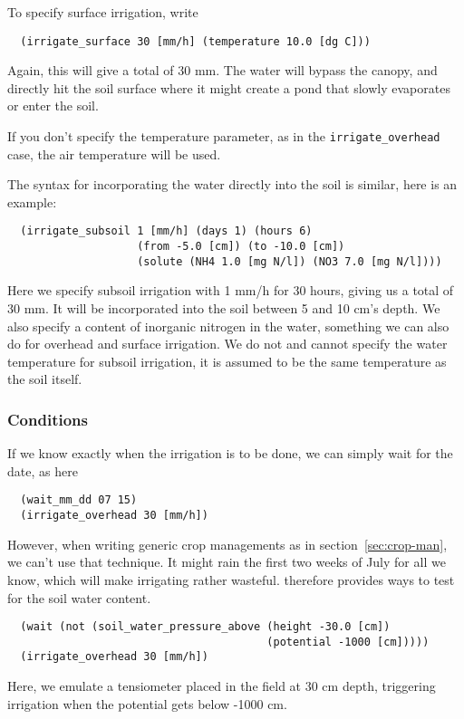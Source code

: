 \documentclass[a4paper,11pt]{article}
\begin{document}
To specify surface irrigation, write
\begin{verbatim}
  (irrigate_surface 30 [mm/h] (temperature 10.0 [dg C]))
\end{verbatim}
Again, this will give a total of 30 mm.  The water will bypass the
canopy, and directly hit the soil surface where it might create a pond
that slowly evaporates or enter the soil.

If you don't specify the temperature parameter, as in the
\texttt{irrigate\_overhead} case, the air temperature will be used.

The syntax for incorporating the water directly into the soil is
similar, here is an example:
\begin{verbatim}
  (irrigate_subsoil 1 [mm/h] (days 1) (hours 6)
                    (from -5.0 [cm]) (to -10.0 [cm])
                    (solute (NH4 1.0 [mg N/l]) (NO3 7.0 [mg N/l])))
\end{verbatim}
Here we specify subsoil irrigation with 1 mm/h for 30 hours, giving us
a total of 30 mm.  It will be incorporated into the soil between 5 and
10 cm's depth.  We also specify a content of inorganic nitrogen in the
water, something we can also do for overhead and surface irrigation.
We do not and cannot specify the water temperature for subsoil
irrigation, it is assumed to be the same temperature as the soil
itself.

\subsubsection{Conditions}

If we know exactly when the irrigation is to be done, we can simply
wait for the date, as here
\begin{verbatim}
  (wait_mm_dd 07 15)
  (irrigate_overhead 30 [mm/h])
\end{verbatim}

However, when writing generic crop managements as in
section~\ref{sec:crop-man}, we can't use that technique.  It might
rain the first two weeks of July for all we know, which will make
irrigating rather wasteful.  \Daisy{} therefore provides ways to test
for the soil water content.
\begin{verbatim}
  (wait (not (soil_water_pressure_above (height -30.0 [cm])
                                        (potential -1000 [cm]))))
  (irrigate_overhead 30 [mm/h])
\end{verbatim}
Here, we emulate a tensiometer placed in the field at 30 cm depth,
triggering irrigation when the potential gets below -1000 cm.
\end{document}
